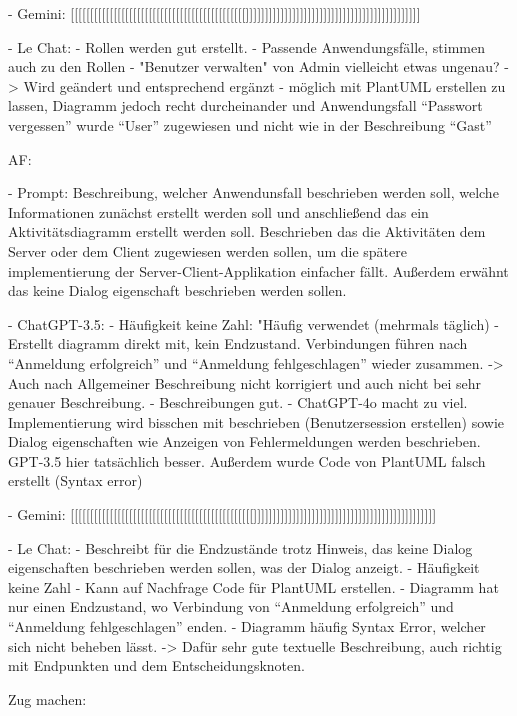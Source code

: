 - Gemini: [[[[[[[[[[[[[[[[[[[[[[[[[[[[[[[[[[[[[[[[[[[[[]]]]]]]]]]]]]]]]]]]]]]]]]]]]]]]]]]]]]]]]]]]]]

- Le Chat:
    - Rollen werden gut erstellt.
    - Passende Anwendungsfälle, stimmen auch zu den Rollen
    - "Benutzer verwalten" von Admin vielleicht etwas ungenau? -> Wird geändert und entsprechend ergänzt
    - möglich mit PlantUML erstellen zu lassen, Diagramm jedoch recht durcheinander und Anwendungsfall ``Passwort vergessen'' wurde ``User'' 
    zugewiesen und nicht wie in der Beschreibung ``Gast''


AF:

- Prompt: Beschreibung, welcher Anwendunsfall beschrieben werden soll, welche Informationen zunächst erstellt werden soll und anschließend das ein 
Aktivitätsdiagramm erstellt werden soll. Beschrieben das die Aktivitäten dem Server oder dem Client zugewiesen werden sollen, um die spätere 
implementierung der Server-Client-Applikation einfacher fällt. Außerdem erwähnt das keine Dialog eigenschaft beschrieben werden sollen.

- ChatGPT-3.5:
    - Häufigkeit keine Zahl: "Häufig verwendet (mehrmals täglich)
    - Erstellt diagramm direkt mit, kein Endzustand. Verbindungen führen nach ``Anmeldung erfolgreich'' und ``Anmeldung fehlgeschlagen'' wieder zusammen.
    -> Auch nach Allgemeiner Beschreibung nicht korrigiert und auch nicht bei sehr genauer Beschreibung.
    - Beschreibungen gut.
    - ChatGPT-4o macht zu viel. Implementierung wird bisschen mit beschrieben (Benutzersession erstellen) sowie Dialog 
    eigenschaften wie Anzeigen von Fehlermeldungen werden beschrieben. GPT-3.5 hier tatsächlich besser. Außerdem wurde Code
    von PlantUML falsch erstellt (Syntax error)


- Gemini: [[[[[[[[[[[[[[[[[[[[[[[[[[[[[[[[[[[[[[[[[[[[[[[]]]]]]]]]]]]]]]]]]]]]]]]]]]]]]]]]]]]]]]]]]]]]]]

- Le Chat:
    - Beschreibt für die Endzustände trotz Hinweis, das keine Dialog eigenschaften beschrieben werden sollen, was der Dialog anzeigt.
    - Häufigkeit keine Zahl
    - Kann auf Nachfrage Code für PlantUML erstellen.
    - Diagramm hat nur einen Endzustand, wo Verbindung von ``Anmeldung erfolgreich'' und ``Anmeldung fehlgeschlagen'' enden.
    - Diagramm häufig Syntax Error, welcher sich nicht beheben lässt. -> Dafür sehr gute textuelle Beschreibung, auch richtig mit 
    Endpunkten und dem Entscheidungsknoten.


    Zug machen:

